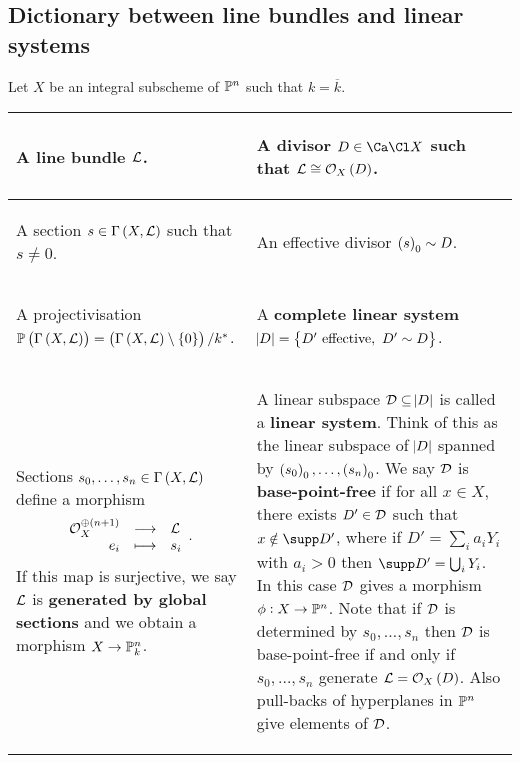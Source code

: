 \subsection{Dictionary between line bundles and linear systems}

Let $ X $ be an integral subscheme of $ \mathbb{P}^n $ such that $ k = \overline{k} $.
\begin{center}
\begin{tabular}{p{}|p{}}
\begin{center} A line bundle $ \mathcal{L} $. \end{center} & \begin{center} A divisor $ D \in \Ca\Cl X $ such that $ \LLL \cong \OOO_X\br{D} $. \end{center} \\
\hline
\begin{center} A section $ s \in \Gamma\br{X, \LLL} $ such that $ s \ne 0 $. \end{center} & \begin{center} An effective divisor $ \br{s}_0 \sim D $. \end{center} \\
\hline
\begin{center} A projectivisation $ \PP\br{\Gamma\br{X, \LLL}} = \br{\Gamma\br{X, \LLL} \setminus \cbr{0}} / k^* $. \end{center} & \begin{center} A \textbf{complete linear system} $ \abs{D} = \cbr{D' \ \text{effective}, \ D' \sim D} $. \end{center} \\
\hline
\begin{center} Sections $ s_0, \dots, s_n \in \Gamma\br{X, \LLL} $ define a morphism $$ \begin{array}{rcl} \OOO_X^{\oplus \br{n + 1}} & \longrightarrow & \LLL \\ e_i & \longmapsto & s_i \end{array}. $$ If this map is surjective, we say $ \mathcal{L} $ is \textbf{generated by global sections} and we obtain a morphism $ X \to \mathbb{P}_k^n $. \end{center} & \begin{center} A linear subspace $ \mathcal{D} \subseteq \abs{D} $ is called a \textbf{linear system}. Think of this as the linear subspace of $ \abs{D} $ spanned by $ \br{s_0}_0, \dots, \br{s_n}_0 $. We say $ \mathcal{D} $ is \textbf{base-point-free} if for all $ x \in X $, there exists $ D' \in \mathcal{D} $ such that $ x \notin \supp D' $, where if $ D' = \sum_i a_iY_i $ with $ a_i > 0 $ then $ \supp D' = \bigcup_i Y_i $. In this case $ \mathcal{D} $ gives a morphism $ \phi : X \to \mathbb{P}^n $. Note that if $ \mathcal{D} $ is determined by $ s_0, \dots, s_n $ then $ \mathcal{D} $ is base-point-free if and only if $ s_0, \dots, s_n $ generate $ \LLL = \OOO_X\br{D} $. Also pull-backs of hyperplanes in $ \mathbb{P}^n $ give elements of $ \mathcal{D} $. \end{center} \\

\end{tabular}
\end{center}
